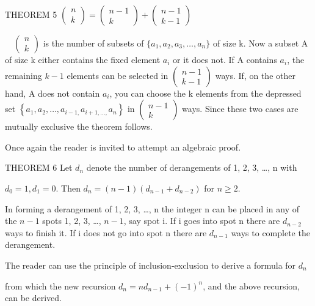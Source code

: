 \documentclass{article}
\begin{document}
THEOREM 5  
$\left(\begin{matrix}n\\k\end{matrix}\right)=\left(\begin{matrix}n-1\\k\end{matrix}\right)+\left(\begin{matrix}n-1\\k-1\end{matrix}\right)$

\ \  $\left(\begin{matrix}n\\k\end{matrix}\right)$ is the number of subsets of  $\{a_1,a_2,a_3,{\dots},a_n\}$ of size k.
 Now a subset  A  of size  k either contains the fixed element $a_i$ or it does not.  If  A  contains  $a_i$, the
remaining  $k-1$ elements can be selected in  $\left(\begin{matrix}n-1\\k-1\end{matrix}\right)$ ways.  If, on the other
hand,  A  does not contain  $a_i$, you can choose the  k  elements from the depressed set  
$\left\{a_1,a_2,{\dots},a_{i-1,}a_{i+1,{\dots},}a_n\right\}$ in  $\left(\begin{matrix}n-1\\k\end{matrix}\right)$ ways. 
Since these two cases are mutually exclusive the theorem follows.  

Once again the reader is invited to attempt an algebraic proof.

THEOREM 6  Let  $d_n$ denote the number of derangements of 1, 2, 3, …, n with

 $d_0=1,d_1=0.$  Then  $d_n=\left(n-1\right)(d_{n-1}+d_{n-2})$ for  $n{\geq}2$.

In forming a derangement of 1, 2, 3, …, n  the integer  n  can be placed in any of the  $n-1$ spots 1, 2, 3, …,  $n-1$,
say spot  i.  If  i  goes into spot  n there are  $d_{n-2}$ ways to finish it.  If  i does not go into spot  n there
are  $d_{n-1}$ ways to complete the derangement.

The reader can use the principle of inclusion-exclusion to derive a formula for  $d_n$

 from which the new  recursion  $d_n=nd_{n-1}+\left(-1\right)^n$, and the above recursion, can be derived.
\end{document}
